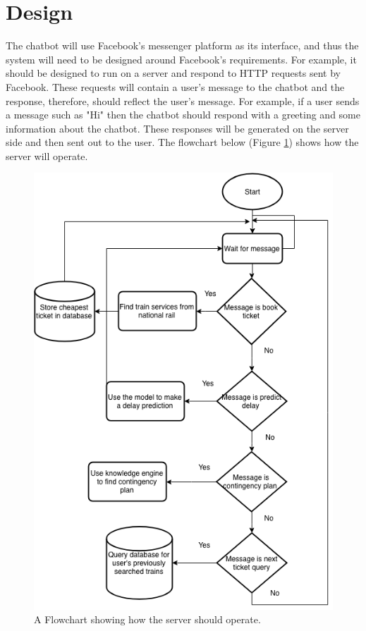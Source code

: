 \documentclass[12pt,a4paper]{article}
\begin{document}
    \section{Design}
    The chatbot will use Facebook's messenger platform as its interface, and thus the system will need to be designed around Facebook's requirements. For example, it should be designed to run on a server and respond to HTTP requests sent by Facebook. These requests will contain a user's message to the chatbot and the response, therefore, should reflect the user's message. For example, if a user sends a message such as "Hi" then the chatbot should respond with a greeting and some information about the chatbot. These responses will be generated on the server side and then sent out to the user. The flowchart below (Figure \ref{fig:server_flowchat}) shows how the server will operate.
    
    \begin{figure}[H]
        \centering
        \includegraphics[scale=0.4]{Images/server_flowchart.png}
        \caption{A Flowchart showing how the server should operate.}
        \label{fig:server_flowchat}
    \end{figure}
    
\end{document}
